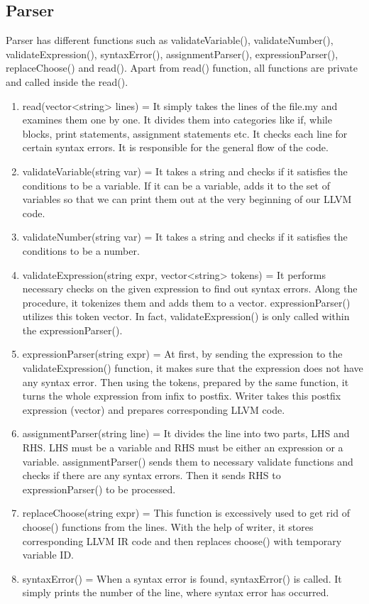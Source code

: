 \documentclass[12pt,a4paper]{article}
\begin{document}
\subsection{Parser}
Parser has different functions such as validateVariable(), validateNumber(), validateExpression(), syntaxError(), assignmentParser(), expressionParser(), replaceChoose() and read(). Apart from read() function, all functions are private and called inside the read(). 

\begin{enumerate}
    \item read(vector<string> lines) = It simply takes the lines of the file.my and examines them one by one. It divides them into categories like if, while blocks, print statements, assignment statements etc. It checks each line for certain syntax errors. It is responsible for the general flow of the code.
    \item validateVariable(string var) = It takes a string and checks if it satisfies the conditions to be a variable. If it can be a variable, adds it to the set of variables so that we can print them out at the very beginning of our LLVM code.
    \item validateNumber(string var) = It takes a string and checks if it satisfies the conditions to be a number. 
    \item validateExpression(string expr, vector<string> tokens) = It performs necessary checks on the given expression to find out syntax errors. Along the procedure, it tokenizes them and adds them to a vector. expressionParser() utilizes this token vector. In fact, validateExpression() is only called within the expressionParser().
    \item expressionParser(string expr) =  At first, by sending the expression to the validateExpression() function, it makes sure that the expression does not have any syntax error. Then using the tokens, prepared by the same function, it turns the whole expression from infix to postfix. Writer takes this postfix expression (vector) and prepares corresponding LLVM code.
    \item assignmentParser(string line) = It divides the line into two parts, LHS and RHS. LHS must be a variable and RHS must be either an expression or a variable. assignmentParser() sends them to necessary validate functions and checks if there are any syntax errors. Then it sends RHS to expressionParser() to be processed.
    \item replaceChoose(string expr) = This function is excessively used to get rid of choose() functions from the lines. With the help of writer, it stores corresponding LLVM IR code and then replaces choose() with temporary variable ID.
    \item syntaxError() = When a syntax error is found, syntaxError() is called. It simply prints the number of the line, where syntax error has occurred.
  \end{enumerate}
\end{document}

